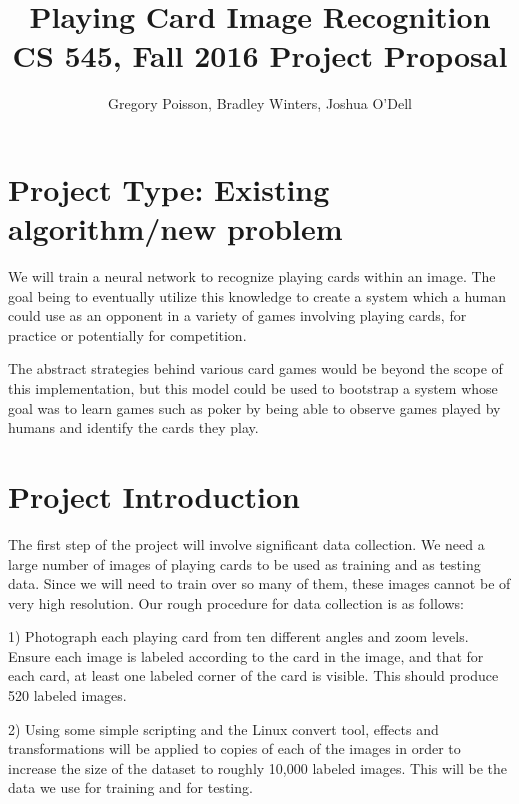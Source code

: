 \documentclass{article}
\begin{document}
\title{ Playing Card Image Recognition\\[1ex] \footnotesize\mdseries CS 545, Fall 2016 Project Proposal }
\author{Gregory Poisson, Bradley Winters, Joshua O'Dell}
\maketitle

\noindent\hrulefill
\vspace{-5mm} %

\section{Project Type:  Existing algorithm/new problem}
We will train a neural network to recognize playing cards within an image.  The goal being to eventually utilize this knowledge to create a system which a human could use as an opponent in a variety of games involving playing cards, for practice or potentially for competition.

The abstract strategies behind various card games would be beyond the scope of this implementation, but this model could be used to bootstrap a system whose goal was to learn games such as poker by being able to observe games played by humans and identify the cards they play.

\section{Project Introduction}
The first step of the project will involve significant data collection. We need a large number of images of playing cards to be used as training and as testing data. Since we will need to train over so many of them, these images cannot be of very high resolution. Our rough procedure for data collection is as follows: 

1) Photograph each playing card from ten different angles and zoom levels. Ensure each image is labeled according to the card in the image, and that for each card, at least one labeled corner of the card is visible. This should produce 520 labeled images. 

2) Using some simple scripting and the Linux convert tool, effects and transformations will be applied to copies of each of the images in order to increase the size of the dataset to roughly 10,000 labeled images. This will be the data we use for training and for testing. 
\end{document}
